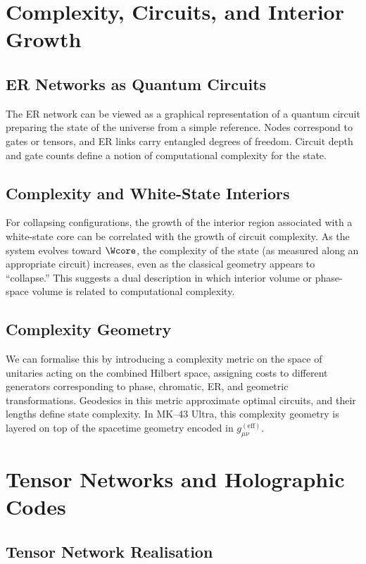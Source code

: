 \chapter{Complexity, Circuits, and Interior Growth}

\section{ER Networks as Quantum Circuits}

The ER network can be viewed as a graphical representation of a quantum circuit preparing the state of the universe from a simple reference.
Nodes correspond to gates or tensors, and ER links carry entangled degrees of freedom.
Circuit depth and gate counts define a notion of computational complexity for the state.

\section{Complexity and White-State Interiors}

For collapsing configurations, the growth of the interior region associated with a white-state core can be correlated with the growth of circuit complexity.
As the system evolves toward $\Wcore$, the complexity of the state (as measured along an appropriate circuit) increases, even as the classical geometry appears to ``collapse.''
This suggests a dual description in which interior volume or phase-space volume is related to computational complexity.

\section{Complexity Geometry}

We can formalise this by introducing a complexity metric on the space of unitaries acting on the combined Hilbert space, assigning costs to different generators corresponding to phase, chromatic, ER, and geometric transformations.
Geodesics in this metric approximate optimal circuits, and their lengths define state complexity.
In MK--43 Ultra, this complexity geometry is layered on top of the spacetime geometry encoded in $g_{\mu\nu}^{\mathrm{(eff)}}$.

\chapter{Tensor Networks and Holographic Codes}

\section{Tensor Network Realisation}

